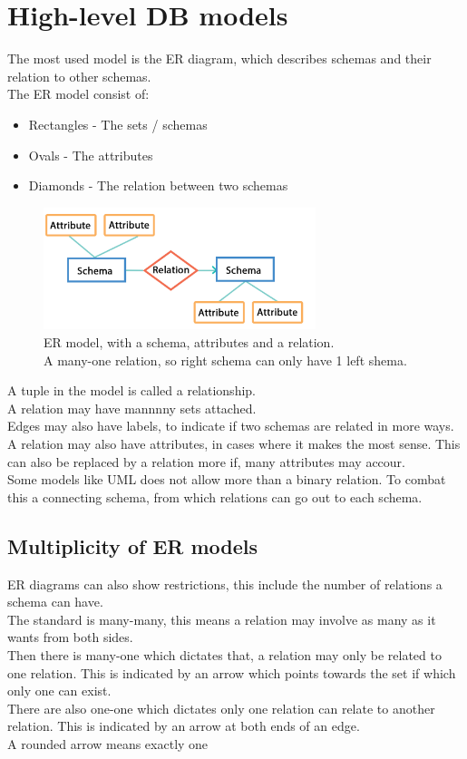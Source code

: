 \documentclass[12pt, a4paper]{article}
\begin{document}
	\section{High-level DB models}
		The most used model is the ER diagram, which describes schemas and their relation to other schemas.\\
		The ER model consist of:
		\begin{itemize}
				  	\item Rectangles - The sets / schemas
					\item Ovals - The attributes 
					\item Diamonds - The relation between two schemas
		\end{itemize}
		
		\begin{figure}[h!]
			\centering
			\caption{ER model, with a schema, attributes and a relation.\\ A many-one relation, so right schema can only have 1 left shema.}
			\includegraphics[width=300px]{assets/ERModel.png}
		\end{figure}
		A tuple in the model is called a relationship.\\
		A relation may have mannnny sets attached.\\
		Edges may also have labels, to indicate if two schemas are related in more ways.\\
		A relation may also have attributes, in cases where it makes the most sense. This can also be replaced by a relation more if, many attributes may accour.\\
		Some models like UML does not allow more than a binary relation. To combat this a connecting schema, from which relations can go out to each schema.
		\subsection{Multiplicity of ER models}
				  ER diagrams can also show restrictions, this include the number of relations a schema can have.\\
				  The standard is many-many, this means a relation may involve as many as it wants from both sides.\\
				  Then there is many-one which dictates that, a relation may only be related to one relation. This is indicated by an arrow which points towards the set if which only one can exist.\\
				  There are also one-one which dictates only one relation can relate to another relation. This is indicated by an arrow at both ends of an edge.\\
				  A rounded arrow means exactly one
\end{document}
